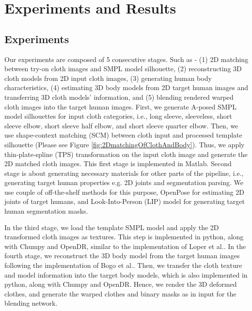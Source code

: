 \section{Experiments and Results }  \label{section:experimentresults}


\subsection{Experiments}

Our experiments are composed of 5 consecutive stages. Such as - (1) 2D matching between try-on cloth images and SMPL\cite{Loper2015SMPLAS} model silhouette, (2) reconstructing 3D cloth models from 2D input cloth images, (3) generating human body characteristics, (4) estimating 3D body models from 2D target human images and transferring 3D cloth models' information, and (5) blending rendered warped cloth images into the target human images. First, we generate A-posed SMPL\cite{Loper2015SMPLAS} model silhouettes for input cloth categories, i.e., long sleeve, sleeveless, short sleeve elbow, short sleeve half elbow, and short sleeve quarter elbow. Then, we use shape-context matching (SCM)\cite{BelongieMP02} between cloth input and processed template silhouette (Please see Figure \ref{fig:2DmatchingOfClothAndBody}). Thus, we apply thin-plate-spline (TPS)\cite{Bookstein1989PrincipalWT} transformation on the input cloth image and generate the 2D matched cloth images. This first stage is implemented in Matlab. Second stage is about generating necessary materials for other parts of the pipeline, i.e., generating target human properties e.g. 2D joints and segmentation parsing. We use couple of off-the-shelf methods for this purpose, OpenPose\cite{Cao2018OpenPoseRM} for estimating 2D joints of target humans, and Look-Into-Person (LIP)\cite{Liang2018LookIP} model for generating target human segmentation masks.

In the third stage, we load the template SMPL\cite{Loper2015SMPLAS} model and apply the 2D transformed cloth images as textures. This step is implemented in python, along with Chumpy\cite{loper2018chumpy} and OpenDR\cite{loper2014opendr}, similar to the implementation of Loper et al.\cite{Loper2015SMPLAS}. In the fourth stage, we reconstruct the 3D body model from the target human images following the implementation of Bogo et al.\cite{Bogo2016SMPLify}. Then, we transfer the cloth texture and model information into the target body models, which is also implemented in python, along with Chumpy\cite{loper2018chumpy} and OpenDR\cite{loper2014opendr}. Hence, we render the 3D deformed clothes, and generate the warped clothes and binary masks as in input for the blending network. 


